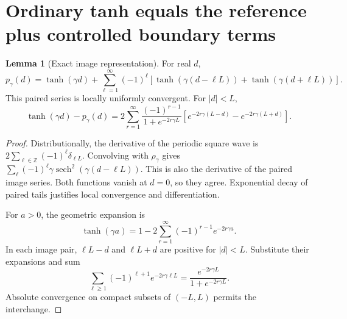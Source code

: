 \documentclass[11pt]{article}
\DeclareMathOperator{\sech}{sech}
\theoremstyle{definition}
\newtheorem{lemma}{Lemma}
\begin{document}
\section{Ordinary tanh equals the reference plus controlled boundary terms}
\begin{lemma}[Exact image representation]
For real $d$,
\[
p_\gamma(d)=\tanh(\gamma d)+\sum_{\ell=1}^\infty(-1)^\ell
[\tanh(\gamma(d-\ell L))+\tanh(\gamma(d+\ell L))].
\]
This paired series is locally uniformly convergent. For $|d|<L$,
\[
\tanh(\gamma d)-p_\gamma(d)
=2\sum_{r=1}^\infty
\frac{(-1)^{r-1}}{1+e^{-2r\gamma L}}
[e^{-2r\gamma(L-d)}-e^{-2r\gamma(L+d)}].
\]
\end{lemma}
\begin{proof}
Distributionally, the derivative of the periodic square wave is
$2\sum_{\ell\in\mathbb Z}(-1)^\ell\delta_{\ell L}$.
Convolving with $\rho_\gamma$ gives
$\sum_\ell(-1)^\ell\gamma\sech^2(\gamma(d-\ell L))$.
This is also the derivative of the paired image series. Both functions
vanish at $d=0$, so they agree. Exponential decay of paired tails justifies
local convergence and differentiation.

For $a>0$, the geometric expansion is
\[
\tanh(\gamma a)=1-2\sum_{r=1}^\infty(-1)^{r-1}e^{-2r\gamma a}.
\]
In each image pair, $\ell L-d$ and $\ell L+d$ are positive for $|d|<L$.
Substitute their expansions and sum
\[
\sum_{\ell\ge1}(-1)^{\ell+1}e^{-2r\gamma\ell L}
=\frac{e^{-2r\gamma L}}{1+e^{-2r\gamma L}}.
\]
Absolute convergence on compact subsets of $(-L,L)$ permits the interchange.
\end{proof}
\end{document}
